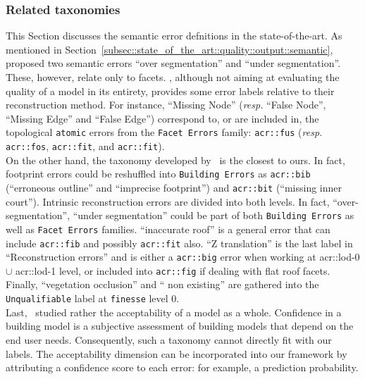         \subsubsection{Related taxonomies}
            This Section discusses the semantic error defnitions in the state-of-the-art.
            As mentioned in Section~\ref{subsec::state_of_the_art::quality::output::semantic},~\textcite{rottensteiner2012isprs} proposed two semantic errors ``over segmentation'' and ``under segmentation''.
            These, however, relate only to facets.
            \textcite{xiong2014graph}, although not aiming at evaluating the quality of a model in its entirety, provides some error labels relative to their reconstruction method.
            For instance, ``Missing Node'' (\textit{resp.} ``False Node'', ``Missing Edge'' and ``False Edge'') correspond to, or are included in, the topological \texttt{atomic} errors from the \texttt{Facet Errors} family: \texttt{\gls{acr::fus}} (\textit{resp.} \texttt{\gls{acr::fos}}, \texttt{\gls{acr::fit}}, and \texttt{\gls{acr::fit}}).\\

            On the other hand, the taxonomy developed by~\textcite{michelin2013quality} is the closest to ours.
            In fact, footprint errors could be reshuffled into \texttt{Building Errors} as \texttt{\gls{acr::bib}} (``erroneous outline'' and ``imprecise footprint'') and \texttt{\gls{acr::bit}} (``missing inner court'').
            Intrinsic reconstruction errors are divided into both levels.
            In fact, ``over-segmentation'', ``under segmentation'' could be part of both \texttt{Building Errors} as well as \texttt{Facet Errors} families.
            ``inaccurate roof'' is a general error that can include \texttt{\gls{acr::fib}} and possibly \texttt{\gls{acr::fit}} also.
            ``Z translation'' is the last label in ``Reconstruction errors'' and is either a \texttt{\gls{acr::big}} error when working at \gls{acr::lod}-0 $\cup$ \gls{acr::lod}-1 level, or included into \texttt{\gls{acr::fig}} if dealing with flat roof facets.
            Finally, ``vegetation occlusion'' and `` non existing'' are gathered into the \texttt{Unqualifiable} label at \texttt{finesse} level 0.\\

            Last,~\textcite{boudet2006supervised} studied rather the acceptability of a model as a whole.
            Confidence in a building model is a subjective assessment of building models that depend on the end user needs.
            Consequently, such a taxonomy cannot directly fit with our labels.
            The acceptability dimension can be incorporated into our framework by attributing a confidence score to each error: for example, a prediction probability.        

